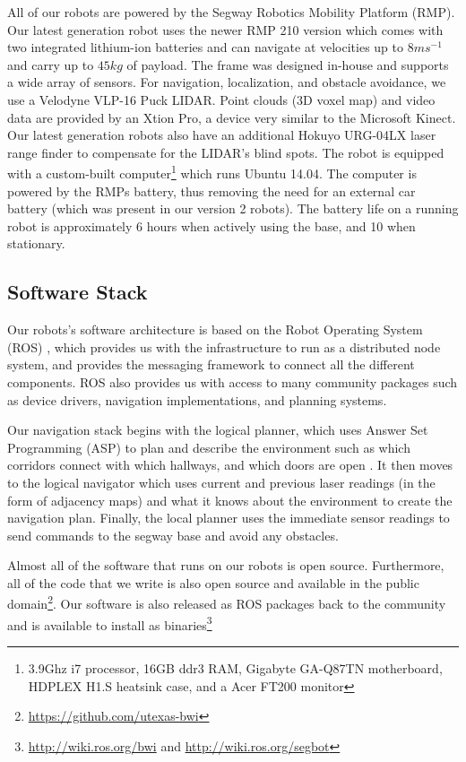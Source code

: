 \documentclass[
  oneside,
  11pt, a4paper,
  footinclude=true,
  headinclude=true,
  cleardoublepage=empty
]{article}
\begin{document}
All of our robots are powered by the Segway Robotics Mobility Platform (RMP).
Our latest generation robot uses the newer RMP 210 version which comes with two
integrated lithium-ion batteries and can navigate at velocities up to $8
ms^{-1}$ and carry up to $45 kg$ of payload. The frame was designed in-house
and supports a wide array of sensors. For navigation, localization, and
obstacle avoidance, we use a Velodyne VLP-16 Puck LIDAR. Point clouds (3D voxel
map) and video data are provided by an Xtion Pro, a device very similar to the
Microsoft Kinect. Our latest generation robots also have an additional Hokuyo
URG-04LX laser range finder to compensate for the LIDAR's blind spots. The
robot is equipped with a custom-built computer\footnote{3.9Ghz i7 processor,
16GB ddr3 RAM, Gigabyte GA-Q87TN motherboard, HDPLEX H1.S heatsink case, and a
Acer FT200 monitor} which runs Ubuntu 14.04. The computer is powered by the
RMPs battery, thus removing the need for an external car battery (which was
present in our version 2 robots).  The battery life on a running robot is
approximately 6 hours when actively using the base, and 10 when stationary.

\subsection{Software Stack}

Our robots's software architecture is based on the Robot Operating System (ROS)
\citep{quigley2009}, which provides us with the infrastructure to run as a
distributed node system, and provides the messaging framework to connect all
the different components. ROS also provides us with access to many community
packages such as device drivers, navigation implementations, and planning
systems.

Our navigation stack begins with the logical planner, which uses Answer Set
Programming (ASP) to plan and describe the environment such as which corridors
connect with which hallways, and which doors are open \citep{lifschitz2008}. It
then moves to the logical navigator which uses current and previous laser readings (in
the form of adjacency maps) and what it knows about the environment to create
the navigation plan. Finally, the local planner uses the immediate sensor
readings to send commands to the segway base and avoid any obstacles.

Almost all of the software that runs on our robots is open source. Furthermore,
all of the code that we write is also open source and available in the public
domain\footnote{\url{https://github.com/utexas-bwi}}. Our software is also
released as ROS packages back to the community and is available to install as
binaries\footnote{\url{http://wiki.ros.org/bwi} and
\url{http://wiki.ros.org/segbot}}
\end{document}
